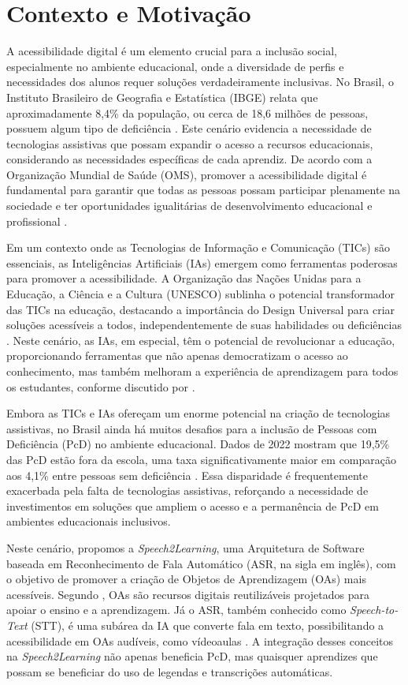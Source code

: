 \section{Contexto e Motivação}

A acessibilidade digital é um elemento crucial para a inclusão social, especialmente no ambiente educacional, onde a diversidade de perfis e necessidades dos alunos requer soluções verdadeiramente inclusivas. No Brasil, o Instituto Brasileiro de Geografia e Estatística (IBGE) relata que aproximadamente 8,4\% da população, ou cerca de 18,6 milhões de pessoas, possuem algum tipo de deficiência \cite{IBGE2022}. Este cenário evidencia a necessidade de tecnologias assistivas que possam expandir o acesso a recursos educacionais, considerando as necessidades específicas de cada aprendiz. De acordo com a Organização Mundial de Saúde (OMS), promover a acessibilidade digital é fundamental para garantir que todas as pessoas possam participar plenamente na sociedade e ter oportunidades igualitárias de desenvolvimento educacional e profissional \cite{OMS2011, OMS2018}.

Em um contexto onde as Tecnologias de Informação e Comunicação (TICs) são essenciais, as Inteligências Artificiais (IAs) emergem como ferramentas poderosas para promover a acessibilidade. A Organização das Nações Unidas para a Educação, a Ciência e a Cultura (UNESCO) sublinha o potencial transformador das TICs na educação, destacando a importância do Design Universal para criar soluções acessíveis a todos, independentemente de suas habilidades ou deficiências \cite{UNESCO2023, GovBr2023}. Neste cenário, as IAs, em especial, têm o potencial de revolucionar a educação, proporcionando ferramentas que não apenas democratizam o acesso ao conhecimento, mas também melhoram a experiência de aprendizagem para todos os estudantes, conforme discutido por .

Embora as TICs e IAs ofereçam um enorme potencial na criação de tecnologias assistivas, no Brasil ainda há muitos desafios para a inclusão de Pessoas com Deficiência (PcD) no ambiente educacional. Dados de 2022 mostram que 19,5\% das PcD estão fora da escola, uma taxa significativamente maior em comparação aos 4,1\% entre pessoas sem deficiência \cite{IBGE2022}. Essa disparidade é frequentemente exacerbada pela falta de tecnologias assistivas, reforçando a necessidade de investimentos em soluções que ampliem o acesso e a permanência de PcD em ambientes educacionais inclusivos.

Neste cenário, propomos a \textit{Speech2Learning}, uma Arquitetura de Software baseada em Reconhecimento de Fala Automático (ASR, na sigla em inglês), com o objetivo de promover a criação de Objetos de Aprendizagem (OAs) mais acessíveis. Segundo , OAs são recursos digitais reutilizáveis projetados para apoiar o ensino e a aprendizagem. Já o ASR, também conhecido como \textit{Speech-to-Text} (STT), é uma subárea da IA que converte fala em texto, possibilitando a acessibilidade em OAs audíveis, como vídeoaulas \cite{Jurafsky2024}. A integração desses conceitos na \textit{Speech2Learning} não apenas beneficia PcD, mas quaisquer aprendizes que possam se beneficiar do uso de legendas e transcrições automáticas.

